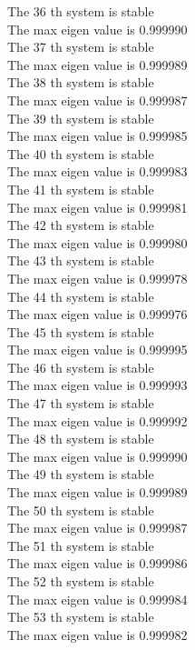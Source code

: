 \documentclass[11pt]{article}
\begin{document}
The 36 th system is stable \\
The max eigen value is 0.999990 \\
The 37 th system is stable \\
The max eigen value is 0.999989 \\
The 38 th system is stable \\
The max eigen value is 0.999987 \\
The 39 th system is stable \\
The max eigen value is 0.999985 \\
The 40 th system is stable \\
The max eigen value is 0.999983 \\
The 41 th system is stable \\
The max eigen value is 0.999981 \\
The 42 th system is stable \\
The max eigen value is 0.999980 \\
The 43 th system is stable \\
The max eigen value is 0.999978 \\
The 44 th system is stable \\
The max eigen value is 0.999976 \\
The 45 th system is stable \\
The max eigen value is 0.999995 \\
The 46 th system is stable \\
The max eigen value is 0.999993 \\
The 47 th system is stable \\
The max eigen value is 0.999992 \\
The 48 th system is stable \\
The max eigen value is 0.999990 \\
The 49 th system is stable \\
The max eigen value is 0.999989 \\
The 50 th system is stable \\
The max eigen value is 0.999987 \\
The 51 th system is stable \\
The max eigen value is 0.999986 \\
The 52 th system is stable \\
The max eigen value is 0.999984 \\
The 53 th system is stable \\
The max eigen value is 0.999982 \\
\end{document}
